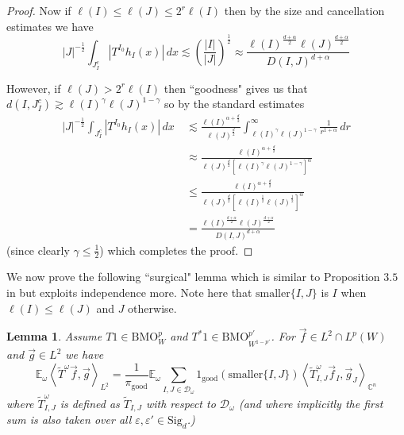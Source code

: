 \documentclass[12pt,reqno ]{amsart}
\numberwithin{equation}{section}
\newtheorem{lemma}[theorem]{Lemma}
\theoremstyle{definition}
\newcommand{\C}{\ensuremath{\mathbb{C}^n}}
\newcommand{\Ew}{\ensuremath{\mathbb{E}_\omega}}
\newcommand{\D}{\ensuremath{\mathscr{D}}}
\newcommand{\Dw}{\ensuremath{\mathscr{D}_\omega}}
\newcommand{\BMOW}{\ensuremath{{\text{BMO}}_W ^p}}
\newcommand{\BMOWq}{\ensuremath{{\text{BMO}}_{W^{1 - p'}}^{p'} }}
\newcommand{\ip}[2]{\ensuremath{\left\langle#1,#2\right\rangle}}
\newcommand{\W}[1]{\ensuremath{\widetilde{#1}}}
\renewcommand{\S}{\ensuremath{\text{Sig}_d}}
\begin{document}
\begin{proof}
Now if $\ell(I) \leq \ell(J) \leq 2^r \ell(I)$ then by the size and cancellation estimates we have  \begin{equation*}  |J|^{-\frac12} \int_{J_I ^c} |{T}^{I_0} h_I(x)| \, dx \lesssim \left(\frac{|I|}{|J|} \right)^\frac12 \approx \frac{\ell(I)^\frac{d + \alpha}{2} \ell(J)^\frac{d + \alpha}{2}}{D(I, J)^{d + \alpha}} \end{equation*}

However, if $\ell(J) > 2^r \ell(I)$ then ``goodness" gives us that $d(I, J_I ^c) \gtrsim \ell(I) ^\gamma \ell(J)^{1 - \gamma}$ so by the standard estimates \begin{align*}   |J|^{-\frac12} \int_{J_I ^c} |{T}^{I_0} h_I(x)| \, dx \  & \lesssim  \frac{\ell(I) ^{\alpha + \frac{d}{2}} }{\ell(J) ^\frac{d}{2}} \int_{\ell(I)^\gamma \ell(J) ^{1 - \gamma}} ^\infty  \frac{1}{r^{1+\alpha}} \, dr \\ &\approx  \frac{\ell(I) ^{\alpha + \frac{d}{2}}}{\ell(J)^\frac{d}{2} \left[\ell(I)^\gamma \ell(J)^{1 - \gamma} \right]^\alpha } \\ & \leq  \frac{\ell(I) ^{\alpha + \frac{d}{2}}}{\ell(J)^\frac{d}{2} \left[\ell(I)^\frac12 \ell(J)^{\frac12} \right]^\alpha } \\ & = \frac{\ell(I)^\frac{d + \alpha}{2} \ell(J)^\frac{d + \alpha}{2}}{D(I, J)^{d + \alpha}}\end{align*} (since clearly $\gamma \leq \frac12$) which completes the proof.

\end{proof}



We now prove the following ``surgical" lemma which is similar to Proposition $3.5$ in \cite{H} but exploits independence more. Note here that $\text{smaller}\{I, J\}$ is $I$ when $\ell(I) \leq \ell(J)$ and $J$ otherwise.
     \begin{lemma} \label{HytonenLem} Assume $T1 \in \BMOW$ and $T^*1 \in \BMOWq$. For $\vec{f} \in L^2 \cap L^p(W)$ and $\vec{g} \in L^2$ we have \begin{equation*}    \Ew \ip{\widetilde{T}^\omega \vec{f}}{\vec{g}}_{L^2}  = \frac{1}{\pi_{\text{good}}} \Ew \sum_{I, J \in \Dw} 1_\text{good} (\text{smaller}\{I, J\}) \ip{\widetilde{T} ^\omega _{I, J} \vec{f}_I}{\vec{g}_J}_{\C}\end{equation*} where  $\widetilde{T} ^\omega _{I, J}$ is defined as $\widetilde{T}  _{I, J}$ with respect to $\D_\omega$ (and where implicitly the first sum is also taken over all $\varepsilon, \varepsilon' \in \S$.)

      \end{lemma}
\end{document}
